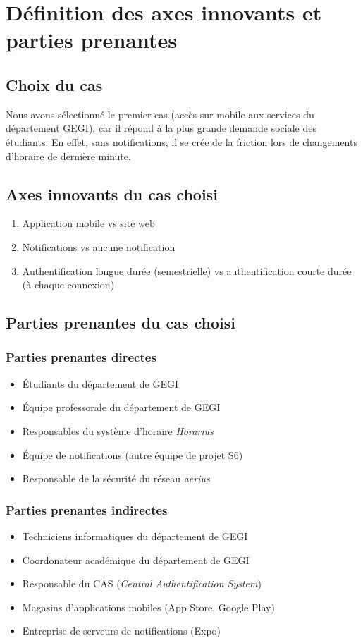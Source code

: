 \section{Définition des axes innovants et parties prenantes}
	\subsection{Choix du cas}
	Nous avons sélectionné le premier cas (accès sur mobile aux services du département GEGI), car il répond à la plus grande demande sociale des étudiants. En effet, sans notifications, il se crée de la friction lors de changements d'horaire de dernière minute.
	
	\subsection{Axes innovants du cas choisi}
	\begin{enumerate}
		\item Application mobile vs site web
		\item Notifications vs aucune notification
		\item Authentification longue durée (semestrielle) vs authentification courte durée (à chaque connexion)
	\end{enumerate}
	
	\subsection{Parties prenantes du cas choisi}
		\subsubsection{Parties prenantes directes}
		\begin{itemize}
			\item Étudiants du département de GEGI
			\item Équipe professorale du département de GEGI
			\item Responsables du système d'horaire \emph{Horarius}
			\item Équipe de notifications (autre équipe de projet S6)
			\item Responsable de la sécurité du réseau \emph{aerius}
		\end{itemize}
		
		\subsubsection{Parties prenantes indirectes}
		\begin{itemize}
			\item Techniciens informatiques du département de GEGI
			\item Coordonateur académique du département de GEGI
			\item Responsable du CAS (\emph{Central Authentification System})
			\item Magasins d'applications mobiles (App Store, Google Play)
			\item Entreprise de serveurs de notifications (Expo)
		\end{itemize}
	